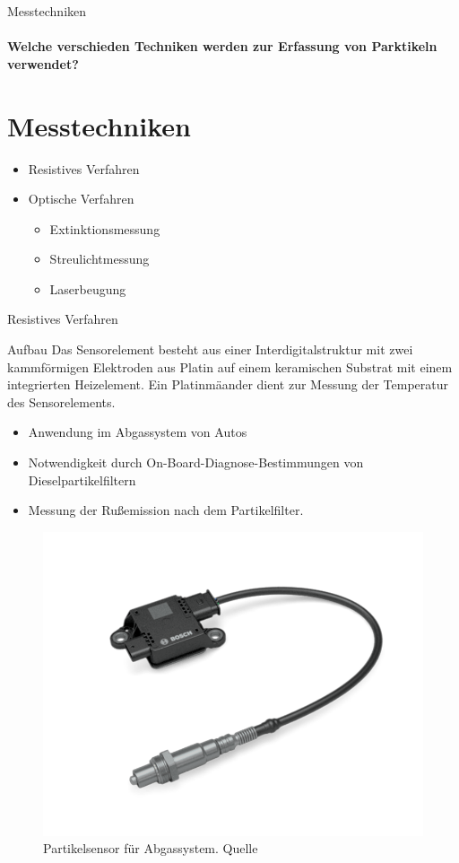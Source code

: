 \documentclass{beamer}
\begin{document}
	\begin{frame}{Messtechniken}
	\framesubtitle{Welche verschieden Techniken werden zur Erfassung von Parktikeln verwendet?}
	\section{Messtechniken}
		\begin{itemize}
			\item Resistives Verfahren
			\item Optische Verfahren	
			\begin{itemize}
				\item Extinktionsmessung
				\item Streulichtmessung
				\item Laserbeugung
			\end{itemize}
		\end{itemize}
	\end{frame}
	
	\begin{frame}{Resistives Verfahren}
		\begin{block}{Aufbau}
			Das Sensorelement besteht aus einer Interdigitalstruktur mit zwei kammförmigen Elektroden aus Platin auf einem keramischen Substrat mit einem integrierten Heizelement. Ein Platinmäander dient zur Messung der Temperatur des Sensorelements.
		\end{block}
		\begin{multicols}{2}
		\footnotesize{
		\begin{itemize}
			\item Anwendung im Abgassystem von Autos 
			\item Notwendigkeit durch On-Board-Diagnose-Bestimmungen von Dieselpartikelfiltern
			\item Messung der Rußemission nach dem Partikelfilter.
		\end{itemize}
		\begin{figure}
			\includegraphics[width=0.35\textheight]{russ.png}
			\caption{\footnotesize Partikelsensor für Abgassystem. Quelle\cite{bosch}}
		\end{figure}}
		\end{multicols}
	\end{frame}
\end{document}
